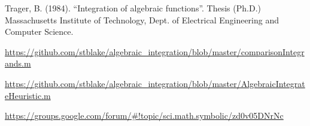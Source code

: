 \documentclass[12pt]{article}
\numberwithin{equation}{section}
\theoremstyle{definition}
\begin{document}
\begin{thebibliography}{99}
 Trager, B. (1984). ``Integration of algebraic functions''. Thesis (Ph.D.) Massachusetts Institute of Technology, Dept. of Electrical Engineering and Computer Science.

 \url{https://github.com/stblake/algebraic_integration/blob/master/comparisonIntegrands.m}

 \url{https://github.com/stblake/algebraic_integration/blob/master/AlgebraicIntegrateHeuristic.m}

 \url{https://groups.google.com/forum/#!topic/sci.math.symbolic/zd0v05DNrNc}

\end{thebibliography}

\iffalse
\appendix

\section*{Showcase of integrals}

\begin{multline*}
\int \sqrt[3]{x^3+x^2} \, dx=\frac{1}{6} (3 x+1)\sqrt[3]{x^3+x^2} + 
\frac{1}{9} \log\left(\sqrt[3]{x^3+x^2}-x\right)- \\
   \frac{1}{18} \log \left(x^2+x\sqrt[3]{x^3+x^2}+\left(x^3+x^2\right)^{2/3}\right)-
   \frac{1}{3 \sqrt{3}}\tan^{-1}\left(\frac{2 \sqrt[3]{x^3+x^2}+x}{\sqrt{3} x}\right)
\end{multline*}

\begin{multline*}
\int \frac{\left(x^2-1\right)
   \sqrt{x^4+x^2+1}}{\left(x^2+1\right) \left(x^4+x^3+x^2+x+1\right)} \, dx=-2
   \tan ^{-1}\left(\frac{\sqrt{x^4+x^2+1}}{x^2-x+1}\right)+ \\ 
   \frac{1}{5} \left(5\sqrt{\sqrt{5}-2}+3 \sqrt{5 \sqrt{5}-10}\right) \tan
   ^{-1}\left(\frac{\sqrt{x^4+x^2+1}}{\sqrt{2+\sqrt{5}}
   \left(x^2-x+1\right)}\right)+ \\ 
   \frac{1}{5} \left(3 \sqrt{10+5 \sqrt{5}}-5\sqrt{2+\sqrt{5}}\right) \tanh ^{-1}\left(\frac{\sqrt{\sqrt{5}-2}
   \left(x^2-x+1\right)}{\sqrt{x^4+x^2+1}}\right)
\end{multline*}

\begin{multline*}
\int \frac{\left(1-x^2\right)^2}{\left(x^2+1\right) \left(x^4+6
   x^2+1\right)^{3/4}} \, dx=\tan ^{-1}\left(\frac{1-x}{\sqrt[4]{x^4+6x^2+1}}\right)- \\
   \tan ^{-1}\left(\frac{x+1}{\sqrt[4]{x^4+6 x^2+1}}\right)-
   \tanh^{-1}\left(\frac{1-x}{\sqrt[4]{x^4+6 x^2+1}}\right)+
   \tanh^{-1}\left(\frac{x+1}{\sqrt[4]{x^4+6 x^2+1}}\right)
\end{multline*}
\fi
\end{document}

